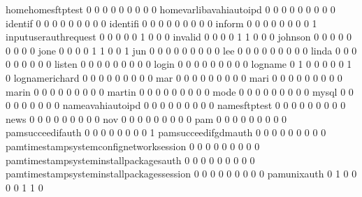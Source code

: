 \documentclass[compress,8pt]{beamer}
\begin{document}
\begin{frame}
\begin{Schunk}
  homehomesftptest                           0   0   0   0   0   0   0   0   0
  homevarlibavahiautoipd                     0   0   0   0   0   0   0   0   0
  identif                                    0   0   0   0   0   0   0   0   0
  identifi                                   0   0   0   0   0   0   0   0   0
  inform                                     0   0   0   0   0   0   0   0   1
  inputuserauthrequest                       0   0   0   0   0   1   0   0   0
  invalid                                    0   0   0   0   1   1   0   0   0
  johnson                                    0   0   0   0   0   0   0   0   0
  jone                                       0   0   0   0   1   1   0   0   1
  jun                                        0   0   0   0   0   0   0   0   0
  lee                                        0   0   0   0   0   0   0   0   0
  linda                                      0   0   0   0   0   0   0   0   0
  listen                                     0   0   0   0   0   0   0   0   0
  login                                      0   0   0   0   0   0   0   0   0
  logname                                    0   1   0   0   0   0   0   1   0
  lognamerichard                             0   0   0   0   0   0   0   0   0
  mar                                        0   0   0   0   0   0   0   0   0
  mari                                       0   0   0   0   0   0   0   0   0
  marin                                      0   0   0   0   0   0   0   0   0
  martin                                     0   0   0   0   0   0   0   0   0
  mode                                       0   0   0   0   0   0   0   0   0
  mysql                                      0   0   0   0   0   0   0   0   0
  nameavahiautoipd                           0   0   0   0   0   0   0   0   0
  namesftptest                               0   0   0   0   0   0   0   0   0
  news                                       0   0   0   0   0   0   0   0   0
  nov                                        0   0   0   0   0   0   0   0   0
  pam                                        0   0   0   0   0   0   0   0   0
  pamsucceedifauth                           0   0   0   0   0   0   0   0   1
  pamsucceedifgdmauth                        0   0   0   0   0   0   0   0   0
  pamtimestampsystemconfignetworksession     0   0   0   0   0   0   0   0   0
  pamtimestampsysteminstallpackagesauth      0   0   0   0   0   0   0   0   0
  pamtimestampsysteminstallpackagessession   0   0   0   0   0   0   0   0   0
  pamunixauth                                0   1   0   0   0   0   1   1   0

\end{Schunk}
\end{frame}
\end{document}
